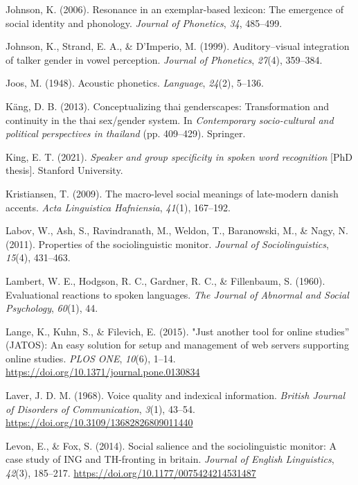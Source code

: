 \documentclass[
  letterpaper,
  DIV=11,
  numbers=noendperiod]{scrartcl}
\newlength{\cslhangindent}
\newenvironment{CSLReferences}[2] %
 {\begin{list}{}{%
  \setlength{\itemindent}{0pt}
  \setlength{\leftmargin}{0pt}
  \setlength{\parsep}{0pt}
  \ifodd #1
   \setlength{\leftmargin}{\cslhangindent}
   \setlength{\itemindent}{-1\cslhangindent}
  \fi
  \setlength{\itemsep}{#2\baselineskip}}}
 {\end{list}}
\begin{document}
\begin{CSLReferences}{1}{0}
Johnson, K. (2006). {Resonance in an exemplar-based lexicon: The
emergence of social identity and phonology.} \emph{Journal of
Phonetics}, \emph{34}, 485--499.

Johnson, K., Strand, E. A., \& D'Imperio, M. (1999). Auditory--visual
integration of talker gender in vowel perception. \emph{Journal of
Phonetics}, \emph{27}(4), 359--384.

Joos, M. (1948). Acoustic phonetics. \emph{Language}, \emph{24}(2),
5--136.

Käng, D. B. (2013). Conceptualizing thai genderscapes: Transformation
and continuity in the thai sex/gender system. In \emph{Contemporary
socio-cultural and political perspectives in thailand} (pp. 409--429).
Springer.

King, E. T. (2021). \emph{Speaker and group specificity in spoken word
recognition} {[}PhD thesis{]}. Stanford University.

Kristiansen, T. (2009). The macro-level social meanings of late-modern
danish accents. \emph{Acta Linguistica Hafniensia}, \emph{41}(1),
167--192.

Labov, W., Ash, S., Ravindranath, M., Weldon, T., Baranowski, M., \&
Nagy, N. (2011). Properties of the sociolinguistic monitor.
\emph{Journal of Sociolinguistics}, \emph{15}(4), 431--463.

Lambert, W. E., Hodgson, R. C., Gardner, R. C., \& Fillenbaum, S.
(1960). Evaluational reactions to spoken languages. \emph{The Journal of
Abnormal and Social Psychology}, \emph{60}(1), 44.

Lange, K., Kuhn, S., \& Filevich, E. (2015). "Just another tool for
online studies'' (JATOS): An easy solution for setup and management of
web servers supporting online studies. \emph{PLOS ONE}, \emph{10}(6),
1--14. \url{https://doi.org/10.1371/journal.pone.0130834}

Laver, J. D. M. (1968). Voice quality and indexical information.
\emph{British Journal of Disorders of Communication}, \emph{3}(1),
43--54. \url{https://doi.org/10.3109/13682826809011440}

Levon, E., \& Fox, S. (2014). Social salience and the sociolinguistic
monitor: {A} case study of {ING} and {TH}-fronting in britain.
\emph{Journal of English Linguistics}, \emph{42}(3), 185--217.
\url{https://doi.org/10.1177/0075424214531487}


\end{CSLReferences}
\end{document}
